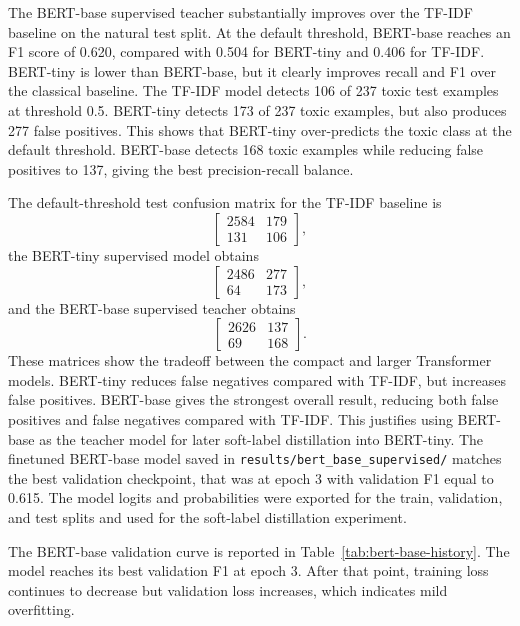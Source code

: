 \documentclass[pdflatex,sn-mathphys-num]{sn-jnl}
\begin{document}
The BERT-base supervised teacher substantially improves over the TF-IDF baseline on the natural test split.
At the default threshold, BERT-base reaches an F1 score of 0.620, compared with 0.504 for BERT-tiny and 0.406 for TF-IDF.
BERT-tiny is lower than BERT-base, but it clearly improves recall and F1 over the classical baseline.
The TF-IDF model detects 106 of 237 toxic test examples at threshold 0.5.
BERT-tiny detects 173 of 237 toxic examples, but also produces 277 false positives.
This shows that BERT-tiny over-predicts the toxic class at the default threshold.
BERT-base detects 168 toxic examples while reducing false positives to 137, giving the best precision-recall balance.

The default-threshold test confusion matrix for the TF-IDF baseline is
\begin{equation}
\begin{bmatrix}
2584 & 179 \\
131 & 106
\end{bmatrix},
\end{equation}
the BERT-tiny supervised model obtains
\begin{equation}
\begin{bmatrix}
2486 & 277 \\
64 & 173
\end{bmatrix},
\end{equation}
and the BERT-base supervised teacher obtains
\begin{equation}
\begin{bmatrix}
2626 & 137 \\
69 & 168
\end{bmatrix}.
\end{equation}
These matrices show the tradeoff between the compact and larger Transformer models.
BERT-tiny reduces false negatives compared with TF-IDF, but increases false positives.
BERT-base gives the strongest overall result, reducing both false positives and false negatives compared with TF-IDF.
This justifies using BERT-base as the teacher model for later soft-label distillation into BERT-tiny.
The finetuned BERT-base model saved in \texttt{results/bert\_base\_supervised/} matches the best validation checkpoint, that was at epoch 3 with validation F1 equal to 0.615.
The model logits and probabilities were exported for the train, validation, and test splits and used for the soft-label distillation experiment.

The BERT-base validation curve is reported in Table~\ref{tab:bert-base-history}.
The model reaches its best validation F1 at epoch 3.
After that point, training loss continues to decrease but validation loss increases, which indicates mild overfitting.
\end{document}
